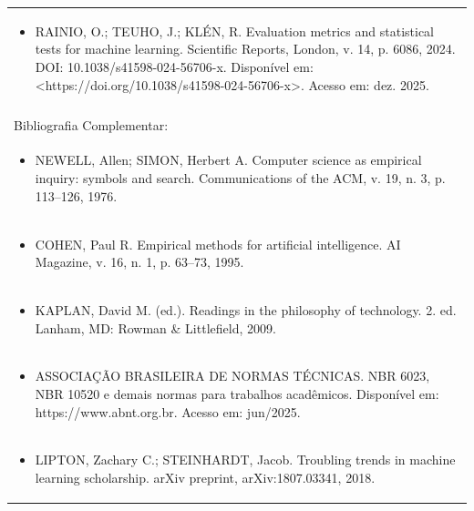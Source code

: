 \documentclass[11pt]{article}
\begin{document}
\begin{center}
\begin{longtable}{|p{4cm}|p{4cm}|p{4cm}|p{4cm}|}
\multicolumn{4}{|p{\dimexpr 16cm + 6\tabcolsep\relax}|}{\begin{itemize}\item RAINIO, O.; TEUHO, J.; KLÉN, R. Evaluation metrics and statistical tests for machine learning. Scientific Reports, London, v. 14, p. 6086, 2024. DOI: 10.1038/s41598-024-56706-x. Disponível em: <https://doi.org/10.1038/s41598-024-56706-x>. Acesso em: dez. 2025.\end{itemize}}\\
\multicolumn{4}{|p{16cm}|}{}\\
\hline
\multicolumn{4}{|p{16cm}|}{Bibliografia Complementar:}\\*
\multicolumn{4}{|p{\dimexpr 16cm + 6\tabcolsep\relax}|}{\begin{itemize}\item NEWELL, Allen; SIMON, Herbert A. Computer science as empirical inquiry: symbols and search. Communications of the ACM, v. 19, n. 3, p. 113–126, 1976.\end{itemize}}\\
\multicolumn{4}{|p{\dimexpr 16cm + 6\tabcolsep\relax}|}{\begin{itemize}\item COHEN, Paul R. Empirical methods for artificial intelligence. AI Magazine, v. 16, n. 1, p. 63–73, 1995.\end{itemize}}\\
\multicolumn{4}{|p{\dimexpr 16cm + 6\tabcolsep\relax}|}{\begin{itemize}\item KAPLAN, David M. (ed.). Readings in the philosophy of technology. 2. ed. Lanham, MD: Rowman \& Littlefield, 2009.\end{itemize}}\\
\multicolumn{4}{|p{\dimexpr 16cm + 6\tabcolsep\relax}|}{\begin{itemize}\item ASSOCIAÇÃO BRASILEIRA DE NORMAS TÉCNICAS. NBR 6023, NBR 10520 e demais normas para trabalhos acadêmicos. Disponível em: https://www.abnt.org.br. Acesso em: jun/2025.\end{itemize}}\\
\multicolumn{4}{|p{\dimexpr 16cm + 6\tabcolsep\relax}|}{\begin{itemize}\item LIPTON, Zachary C.; STEINHARDT, Jacob. Troubling trends in machine learning scholarship. arXiv preprint, arXiv:1807.03341, 2018.\end{itemize}}\\

\end{longtable}
\end{center}
\end{document}
